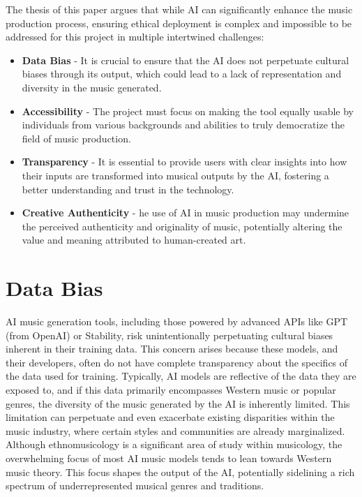 \documentclass[10pt,twocolumn]{article}
\begin{document}
The thesis of this paper argues that while AI can significantly enhance the music production process, ensuring ethical deployment is complex and impossible to be addressed for this project in multiple intertwined challenges:


\begin{itemize}
    \item \textbf{Data Bias} - It is crucial to ensure that the AI does not perpetuate cultural biases through its output, which could lead to a lack of representation and diversity in the music generated.
    \item \textbf{Accessibility} - The project must focus on making the tool equally usable by individuals from various backgrounds and abilities to truly democratize the field of music production.
    \item \textbf{Transparency} - It is essential to provide users with clear insights into how their inputs are transformed into musical outputs by the AI, fostering a better understanding and trust in the technology.
    \item \textbf{Creative Authenticity} - he use of AI in music production may undermine the perceived authenticity and originality of music, potentially altering the value and meaning attributed to human-created art.
\end{itemize}

\section{Data Bias}

AI music generation tools, including those powered by advanced APIs like GPT (from OpenAI) or Stability, risk unintentionally perpetuating cultural biases inherent in their training data. This concern arises because these models, and their developers, often do not have complete transparency about the specifics of the data used for training. Typically, AI models are reflective of the data they are exposed to, and if this data primarily encompasses Western music or popular genres, the diversity of the music generated by the AI is inherently limited. This limitation can perpetuate and even exacerbate existing disparities within the music industry, where certain styles and communities are already marginalized. Although ethnomusicology is a significant area of study within musicology, the overwhelming focus of most AI music models tends to lean towards Western music theory. This focus shapes the output of the AI, potentially sidelining a rich spectrum of underrepresented musical genres and traditions.
\end{document}
